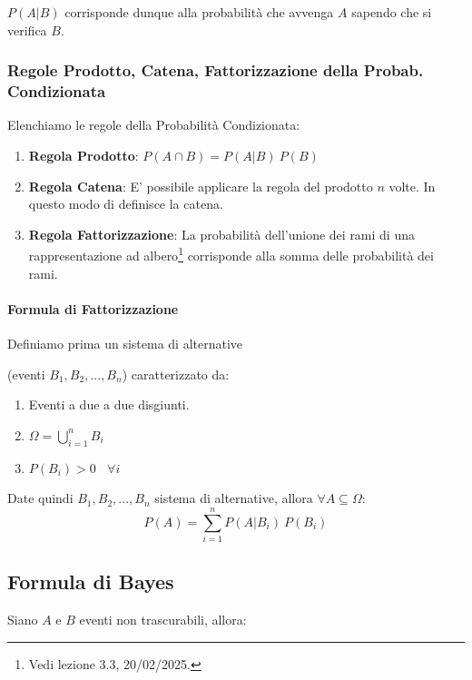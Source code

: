 \documentclass{article}
\begin{document}
$P(A|B)$ corrisponde dunque alla probabilità che avvenga $A$ sapendo che si verifica $B$.

\subsubsection{Regole Prodotto, Catena, Fattorizzazione della Probab. Condizionata}

Elenchiamo le regole della Probabilità Condizionata:

\begin{enumerate}
    \item \textbf{Regola Prodotto}: $P(A \cap B) = P(A|B) \: P(B)$
    \item \textbf{Regola Catena}: E' possibile applicare la regola del prodotto $n$ volte. In questo modo di definisce la catena.
    \item \textbf{Regola Fattorizzazione}: La probabilità dell'unione dei rami di una rappresentazione ad albero\footnote{Vedi lezione 3.3, 20/02/2025.} corrisponde alla somma delle probabilità dei rami.
\end{enumerate}

\paragraph{Formula di Fattorizzazione}

Definiamo prima un sistema di alternative 

(eventi $B_{1}, B_{2}, ..., B_{n}$) caratterizzato da:

\begin{enumerate}
    \item Eventi a due a due disgiunti.
    \item $\Omega = \bigcup_{i=1}^{n} B_{i} $
    \item $P(B_{i}) > 0 \: \: \: \: \forall i$
\end{enumerate}

Date quindi $B_{1}, B_{2}, ..., B_{n}$ sistema di alternative, allora $\forall A \subseteq \Omega$:
\vspace*{-5px}
\[ \boxed{P(A) = \sum_{i=1}^{n} P(A|B_{i}) \: P(B_{i}) }\]

\newpage

\subsection{Formula di Bayes}

Siano $A$ e $B$ eventi non trascurabili, allora:
\end{document}
